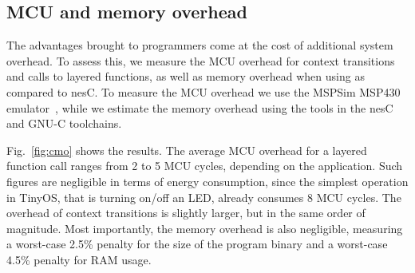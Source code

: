 \subsection{MCU and memory overhead}\label{sec:overhead}

The advantages brought to programmers come at the cost of additional
system overhead. To assess this, we measure the MCU overhead for
context transitions and calls to layered functions, as well as memory
overhead when using \conesc as compared to nesC. To measure the MCU
overhead we use the MSPSim MSP430 emulator~\cite{eriksson09}, while we
estimate the memory overhead using the tools in the nesC and GNU-C
toolchains.


 Fig.~\ref{fig:cmo} shows the results. The average MCU
overhead for a layered function call ranges from 2 to 5 MCU cycles,
depending on the application. Such figures are negligible in terms of
energy consumption, since the simplest operation in TinyOS, that is
turning on/off an LED, already consumes 8 MCU cycles. The overhead of
context transitions is slightly larger, but in the same order of
magnitude. Most importantly, the memory overhead is also negligible,
measuring a worst-case 2.5\% penalty for the size of the program
binary and a worst-case 4.5\% penalty for RAM usage.

